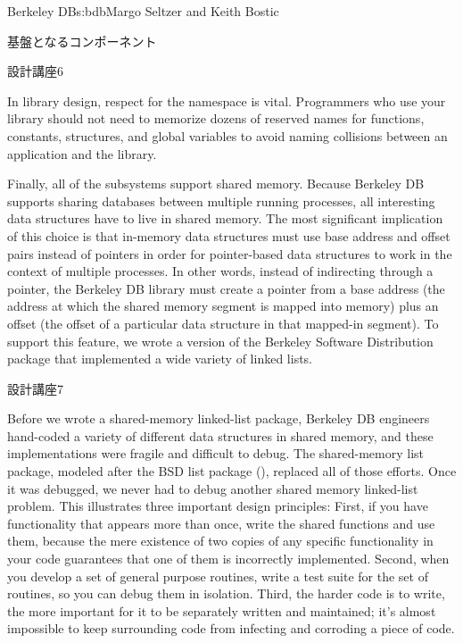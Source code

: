 \begin{aosachapter}{Berkeley DB}{s:bdb}{Margo Seltzer and Keith Bostic}
\begin{aosasect1}{基盤となるコンポーネント}
\begin{aosabox}{設計講座6}

In library design, respect for the namespace is vital. Programmers who
use your library should not need to memorize dozens of reserved names
for functions, constants, structures, and global variables to avoid
naming collisions between an application and the library.

\end{aosabox}

Finally, all of the subsystems support shared memory. Because Berkeley
DB supports sharing databases between multiple running processes, all
interesting data structures have to live in shared memory. The most
significant implication of this choice is that in-memory data
structures must use base address and offset pairs instead of pointers
in order for pointer-based data structures to work in the context of
multiple processes. In other words, instead of indirecting through a
pointer, the Berkeley DB library must create a pointer from a base
address (the address at which the shared memory segment is mapped into
memory) plus an offset (the offset of a particular data structure in
that mapped-in segment). To support this feature, we
wrote a version of the Berkeley Software Distribution  package
that implemented a wide variety of linked lists. 

\begin{aosabox}{設計講座7}

Before we wrote a shared-memory linked-list package, Berkeley DB
engineers hand-coded a variety of different data structures in shared
memory, and these implementations were fragile and difficult to
debug. The shared-memory list package, modeled after the BSD list
package (), replaced all of those efforts.  Once it was
debugged, we never had to debug another shared memory linked-list
problem.  This illustrates three important design principles: First,
if you have functionality that appears more than once, write the
shared functions and use them, because the mere existence of two
copies of any specific functionality in your code guarantees that one
of them is incorrectly implemented.  Second, when you develop a set of
general purpose routines, write a test suite for the set of routines,
so you can debug them in isolation.  Third, the harder code is to
write, the more important for it to be separately written and
maintained; it's almost impossible to keep surrounding code from
infecting and corroding a piece of code.


\end{aosabox}
\end{aosasect1}
\end{aosachapter}

